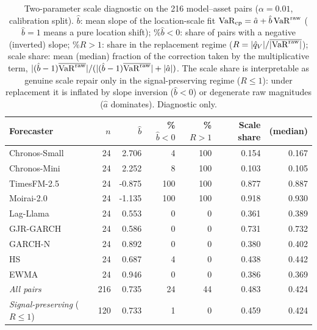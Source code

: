 \begin{table}[htbp]
	\centering
	\caption{Two-parameter scale diagnostic on the 216 model--asset pairs ($\alpha = 0.01$, calibration split). $\hat b$: mean slope of the location-scale fit $\mathrm{VaR}_{\mathrm{cp}}=\hat a+\hat b\,\mathrm{VaR}^{\mathrm{raw}}$ ($\hat b=1$ means a pure location shift); \%$\hat b{<}0$: share of pairs with a negative (inverted) slope; \%$R{>}1$: share in the replacement regime ($R=|\hat q_V|/\overline{|\mathrm{VaR}^{\mathrm{raw}}|}$); scale share: mean (median) fraction of the correction taken by the multiplicative term, $|(\hat b-1)\overline{\mathrm{VaR}^{\mathrm{raw}}}|/(|(\hat b-1)\overline{\mathrm{VaR}^{\mathrm{raw}}}|+|\hat a|)$. The scale share is interpretable as genuine scale repair only in the signal-preserving regime ($R\le1$): under replacement it is inflated by slope inversion ($\hat b<0$) or degenerate raw magnitudes ($\hat a$ dominates). Diagnostic only.}
	\label{tab:scale_diagnostic}
	\footnotesize
	\begin{tabular}{@{}lrrrrrr@{}}
		\hline\hline
		Forecaster & $n$ & $\hat b$ & \%$\hat b{<}0$ & \%$R{>}1$ & Scale share & (median) \\
		\hline
		Chronos-Small & 24 & 2.706 & 4 & 100 & 0.154 & 0.167 \\
		Chronos-Mini & 24 & 2.252 & 8 & 100 & 0.103 & 0.105 \\
		TimesFM-2.5 & 24 & -0.875 & 100 & 100 & 0.877 & 0.887 \\
		Moirai-2.0 & 24 & -1.135 & 100 & 100 & 0.918 & 0.930 \\
		Lag-Llama & 24 & 0.553 & 0 & 0 & 0.361 & 0.389 \\
		GJR-GARCH & 24 & 0.586 & 0 & 0 & 0.731 & 0.732 \\
		GARCH-N & 24 & 0.892 & 0 & 0 & 0.380 & 0.402 \\
		HS & 24 & 0.687 & 4 & 0 & 0.438 & 0.442 \\
		EWMA & 24 & 0.946 & 0 & 0 & 0.386 & 0.369 \\
		\hline
		\textit{All pairs} & 216 & 0.735 & 24 & 44 & 0.483 & 0.424 \\
		\textit{Signal-preserving} ($R\le1$) & 120 & 0.733 & 1 & 0 & 0.459 & 0.424 \\
		\hline\hline
	\end{tabular}
\end{table}
